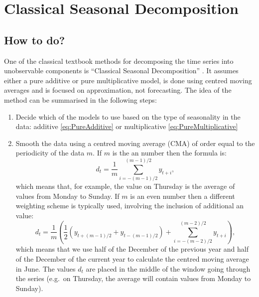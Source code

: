 \documentclass[
]{book}
\providecommand{\tightlist}{%
  \setlength{\itemsep}{0pt}\setlength{\parskip}{0pt}}
\theoremstyle{definition}
\theoremstyle{definition}
\theoremstyle{definition}
\theoremstyle{definition}
\theoremstyle{remark}
\begin{document}
\hypertarget{ClassicalDecomposition}{%
\section{Classical Seasonal Decomposition}\label{ClassicalDecomposition}}

\hypertarget{how-to-do}{%
\subsection{How to do?}\label{how-to-do}}

One of the classical textbook methods for decomposing the time series into unobservable components is ``Classical Seasonal Decomposition'' \citep{Persons1919}. It assumes either a pure additive or pure multiplicative model, is done using centred moving averages and is focused on approximation, not forecasting. The idea of the method can be summarised in the following steps:

\begin{enumerate}
\def\labelenumi{\arabic{enumi}.}
\tightlist
\item
  Decide which of the models to use based on the type of seasonality in the data: additive \eqref{eq:PureAdditive} or multiplicative \eqref{eq:PureMultiplicative}
\item
  Smooth the data using a centred moving average (CMA) of order equal to the periodicity of the data \(m\). If \(m\) is the an number then the formula is:
  \begin{equation}
   d_t = \frac{1}{m}\sum_{i=-(m-1)/2}^{(m-1)/2} y_{t+i},
   \label{eq:CMAOdd}
  \end{equation}
  which means that, for example, the value on Thursday is the average of values from Monday to Sunday. If \(m\) is an even number then a different weighting scheme is typically used, involving the inclusion of additional an value:
  \begin{equation}
   d_t = \frac{1}{m}\left(\frac{1}{2}\left(y_{t+(m-1)/2}+y_{t-(m-1)/2}\right) + \sum_{i=-(m-2)/2}^{(m-2)/2} y_{t+i}\right),
   \label{eq:CMAEven}
  \end{equation}
  which means that we use half of the December of the previous year and half of the December of the current year to calculate the centred moving average in June. The values \(d_t\) are placed in the middle of the window going through the series (e.g.~on Thursday, the average will contain values from Monday to Sunday).
\end{enumerate}
\end{document}
